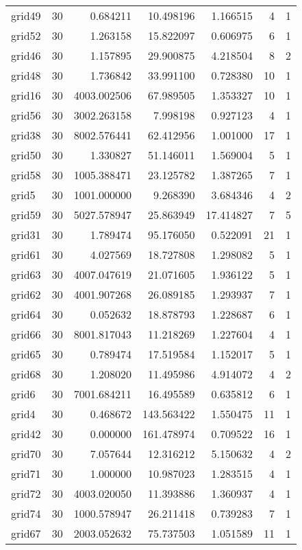 \begin{longtable}{|l|r|r|r|r|r|r|}
grid49 & 30 & 0.684211 & 10.498196 & 1.166515 & 4 & 1 \\
grid52 & 30 & 1.263158 & 15.822097 & 0.606975 & 6 & 1 \\
grid46 & 30 & 1.157895 & 29.900875 & 4.218504 & 8 & 2 \\
grid48 & 30 & 1.736842 & 33.991100 & 0.728380 & 10 & 1 \\
grid16 & 30 & 4003.002506 & 67.989505 & 1.353327 & 10 & 1 \\
grid56 & 30 & 3002.263158 & 7.998198 & 0.927123 & 4 & 1 \\
grid38 & 30 & 8002.576441 & 62.412956 & 1.001000 & 17 & 1 \\
grid50 & 30 & 1.330827 & 51.146011 & 1.569004 & 5 & 1 \\
grid58 & 30 & 1005.388471 & 23.125782 & 1.387265 & 7 & 1 \\
grid5 & 30 & 1001.000000 & 9.268390 & 3.684346 & 4 & 2 \\
grid59 & 30 & 5027.578947 & 25.863949 & 17.414827 & 7 & 5 \\
grid31 & 30 & 1.789474 & 95.176050 & 0.522091 & 21 & 1 \\
grid61 & 30 & 4.027569 & 18.727808 & 1.298082 & 5 & 1 \\
grid63 & 30 & 4007.047619 & 21.071605 & 1.936122 & 5 & 1 \\
grid62 & 30 & 4001.907268 & 26.089185 & 1.293937 & 7 & 1 \\
grid64 & 30 & 0.052632 & 18.878793 & 1.228687 & 6 & 1 \\
grid66 & 30 & 8001.817043 & 11.218269 & 1.227604 & 4 & 1 \\
grid65 & 30 & 0.789474 & 17.519584 & 1.152017 & 5 & 1 \\
grid68 & 30 & 1.208020 & 11.495986 & 4.914072 & 4 & 2 \\
grid6 & 30 & 7001.684211 & 16.495589 & 0.635812 & 6 & 1 \\
grid4 & 30 & 0.468672 & 143.563422 & 1.550475 & 11 & 1 \\
grid42 & 30 & 0.000000 & 161.478974 & 0.709522 & 16 & 1 \\
grid70 & 30 & 7.057644 & 12.316212 & 5.150632 & 4 & 2 \\
grid71 & 30 & 1.000000 & 10.987023 & 1.283515 & 4 & 1 \\
grid72 & 30 & 4003.020050 & 11.393886 & 1.360937 & 4 & 1 \\
grid74 & 30 & 1000.578947 & 26.211418 & 0.739283 & 7 & 1 \\
grid67 & 30 & 2003.052632 & 75.737503 & 1.051589 & 11 & 1 \\

\end{longtable}
